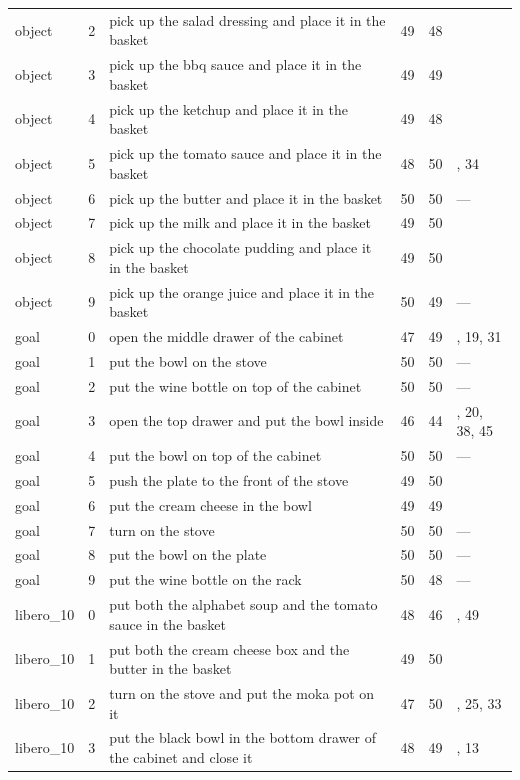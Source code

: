 {\begin{longtable}{@{}l r p{6.6cm} r r >{\raggedright\arraybackslash}p{1.6cm}@{}}
    object & 2 & pick up the salad dressing and place it in the basket & 49 & 48 & 38 \\
    object & 3 & pick up the bbq sauce and place it in the basket & 49 & 49 & 33 \\
    object & 4 & pick up the ketchup and place it in the basket & 49 & 48 & 7 \\
    object & 5 & pick up the tomato sauce and place it in the basket & 48 & 50 & 7, 34 \\
    object & 6 & pick up the butter and place it in the basket & 50 & 50 & --- \\
    object & 7 & pick up the milk and place it in the basket & 49 & 50 & 1 \\
    object & 8 & pick up the chocolate pudding and place it in the basket & 49 & 50 & 16 \\
    object & 9 & pick up the orange juice and place it in the basket & 50 & 49 & --- \\
    goal & 0 & open the middle drawer of the cabinet & 47 & 49 & 1, 19, 31 \\
    goal & 1 & put the bowl on the stove & 50 & 50 & --- \\
    goal & 2 & put the wine bottle on top of the cabinet & 50 & 50 & --- \\
    goal & 3 & open the top drawer and put the bowl inside & 46 & 44 & 4, 20, 38, 45 \\
    goal & 4 & put the bowl on top of the cabinet & 50 & 50 & --- \\
    goal & 5 & push the plate to the front of the stove & 49 & 50 & 44 \\
    goal & 6 & put the cream cheese in the bowl & 49 & 49 & 49 \\
    goal & 7 & turn on the stove & 50 & 50 & --- \\
    goal & 8 & put the bowl on the plate & 50 & 50 & --- \\
    goal & 9 & put the wine bottle on the rack & 50 & 48 & --- \\
    libero\_10 & 0 & put both the alphabet soup and the tomato sauce in the basket & 48 & 46 & 18, 49 \\
    libero\_10 & 1 & put both the cream cheese box and the butter in the basket & 49 & 50 & 33 \\
    libero\_10 & 2 & turn on the stove and put the moka pot on it & 47 & 50 & 6, 25, 33 \\
    libero\_10 & 3 & put the black bowl in the bottom drawer of the cabinet and close it & 48 & 49 & 2, 13 \\

\end{longtable}}
